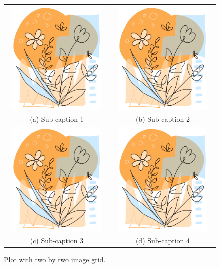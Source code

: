\begin{figure}[htbp] 
\centering
  \begin{tabular}{c c}
    \includegraphics[width=65mm, height = 55mm]{Chapters/Chapter_2/figures/image1.png}  &    \includegraphics[width=65mm, height = 55mm]{Chapters/Chapter_2/figures/image1.png} \\
    \vspace{1mm}
    (a) Sub-caption 1 & (b) Sub-caption 2 \\
    
    \vspace{1mm}
    
    \includegraphics[width=65mm, height = 55mm]{Chapters/Chapter_2/figures/image1.png}
     &
    \includegraphics[width=65mm, height = 55mm]{Chapters/Chapter_2/figures/image1.png}\\
    \vspace{1mm}
    (c) Sub-caption 3 & (d) Sub-caption 4 \\
    
   
  
  \end{tabular}
 \caption{Plot with two by two image grid.
}
  \label{fig:image2_4}
\end{figure}